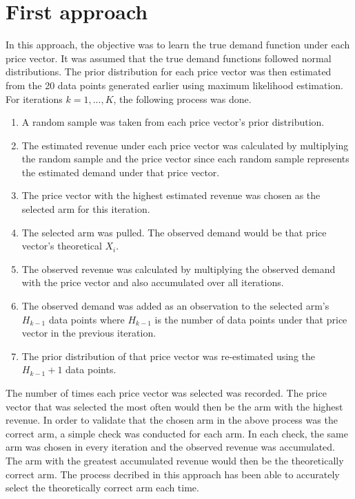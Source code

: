 \documentclass[a4paper]{article}
\begin{document}
\section{First approach}
In this approach, the objective was to learn the true demand function under each price vector. It was assumed that the true demand functions followed normal distributions. The prior distribution for each price vector was then estimated from the 20 data points generated earlier using maximum likelihood estimation. 
\newline
\newline
For iterations $k = 1,...,K$, the following process was done. 
\begin{enumerate}
	\item A random sample was taken from each price vector's prior distribution.
	\item The estimated revenue under each price vector was calculated by multiplying the random sample and the price vector since each random sample represents the estimated demand under that price vector.
	\item The price vector with the highest estimated revenue was chosen as the selected arm for this iteration.
	\item The selected arm was pulled. The observed demand would be that price vector's theoretical $X_i$.
	\item The observed revenue was calculated by multiplying the observed demand with the price vector and also accumulated over all iterations.
	\item The observed demand was added as an observation to the selected arm's $H_{k-1}$ data points where $H_{k-1}$ is the number of data points under that price vector in the previous iteration.
	\item The prior distribution of that price vector was re-estimated using the $H_{k-1} + 1$ data points.
\end{enumerate}

The number of times each price vector was selected was recorded. The price vector that was selected the most often would then be the arm with the highest revenue.
\newline
\newline
In order to validate that the chosen arm in the above process was the correct arm, a simple check was conducted for each arm. In each check, the same arm was chosen in every iteration and the observed revenue was accumulated. The arm with the greatest accumulated revenue would then be the theoretically correct arm. 
\newline
\newline
The process decribed in this approach has been able to accurately select the theoretically correct arm each time.
\end{document}
